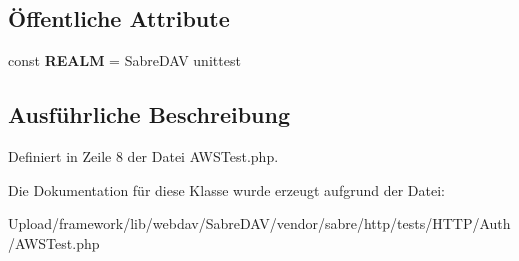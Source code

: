 \subsection*{Öffentliche Attribute}
\begin{DoxyCompactItemize}
\item 
\mbox{\label{class_sabre_1_1_h_t_t_p_1_1_auth_1_1_a_w_s_test_ab0775017204d8534d7af37adca56ab07}} 
const {\bfseries R\+E\+A\+LM} = \textquotesingle{}Sabre\+D\+AV unittest\textquotesingle{}
\end{DoxyCompactItemize}


\subsection{Ausführliche Beschreibung}


Definiert in Zeile 8 der Datei A\+W\+S\+Test.\+php.



Die Dokumentation für diese Klasse wurde erzeugt aufgrund der Datei\+:\begin{DoxyCompactItemize}
\item 
Upload/framework/lib/webdav/\+Sabre\+D\+A\+V/vendor/sabre/http/tests/\+H\+T\+T\+P/\+Auth/A\+W\+S\+Test.\+php\end{DoxyCompactItemize}
